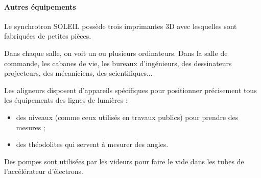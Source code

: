 			\paragraph{Autres équipements}
				Le synchrotron SOLEIL possède trois imprimantes 3D avec lesquelles sont fabriquées de petites pièces.

				Dans chaque salle, on voit un ou plusieurs ordinateurs. Dans la salle de commande, les cabanes de vie, les bureaux d'ingénieurs, des dessinateurs projecteurs, des mécaniciens, des scientifiques... 

				Les aligneurs disposent d'appareils spécifiques pour positionner précisement tous les équipements des lignes de lumières :
				\begin{itemize}	
				 \item des niveaux (comme ceux utilisés en travaux publics) pour prendre des mesures ;
				 \item des théodolites qui servent à mesurer des angles.
				\end{itemize}

				Des pompes sont utilisées par les videurs pour faire le vide dans les tubes de l'accélérateur d'électrons.





%
%